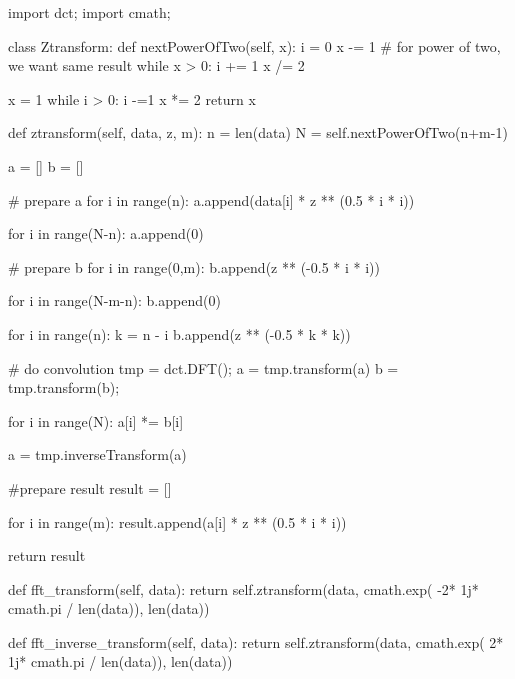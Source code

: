 \begin{python}

import dct;
import cmath;

class Ztransform:
    def nextPowerOfTwo(self, x):
        i = 0
        x -= 1 # for power of two, we want same result
        while x > 0:
            i += 1
            x /= 2

        x = 1
        while i > 0:
            i -=1
            x *= 2
        return x
        
    def ztransform(self, data, z, m):
        n = len(data)
        N = self.nextPowerOfTwo(n+m-1)

        a = []
        b = []
        
        # prepare a
        for i in range(n):
            a.append(data[i] * z ** (0.5 * i * i))

        for i in range(N-n):
            a.append(0)

        # prepare b
        for i in range(0,m):
            b.append(z ** (-0.5 * i * i))

        for i in range(N-m-n):
            b.append(0)

        for i in range(n):
            k = n - i
            b.append(z ** (-0.5 * k * k))

        # do convolution
        tmp = dct.DFT();
        a = tmp.transform(a)
        b = tmp.transform(b);

        for i in range(N):
            a[i] *= b[i]

        a = tmp.inverseTransform(a)

        #prepare result
        result = []

        for i in range(m):
            result.append(a[i] * z ** (0.5 * i * i))

        return result

    def fft_transform(self, data):
        return self.ztransform(data, 
                               cmath.exp( -2* 1j* cmath.pi / len(data)),
                               len(data))

    def fft_inverse_transform(self, data):
        return self.ztransform(data, 
                               cmath.exp( 2* 1j* cmath.pi / len(data)),
                               len(data))

\end{python}

